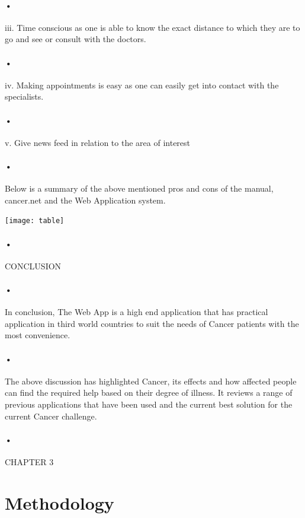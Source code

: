 \documentclass[12pt]{article}
\begin{document}
\paragraph{•}iii. Time conscious as one is able to know the exact distance to which they are to go and see or consult with the doctors.
\paragraph{•}iv. Making appointments is easy as one can easily get into contact with the specialists.
\paragraph{•}v.	Give news feed in relation to the area of interest

\paragraph{•}Below is a summary of the above mentioned pros and cons of the manual, cancer.net and the Web Application system.

\begin{center}
\texttt{[image: table]}
\end{center}

\paragraph{•}CONCLUSION

\paragraph{•}In conclusion, The Web App is a high end application that has practical application in third world countries to suit the needs of Cancer patients with the most convenience.
\paragraph{•}The above discussion has highlighted Cancer, its effects and how affected people can find the required help based on their degree of illness. It reviews a range of previous applications that have been used and the current best solution for the current Cancer challenge.


\paragraph{•}CHAPTER 3
\section{Methodology}
\end{document}
